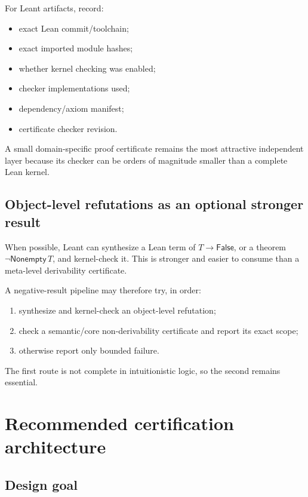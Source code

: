 \documentclass[11pt,letterpaper,openany]{report}
\theoremstyle{definition}
\theoremstyle{remark}
\begin{document}
For Leant artifacts, record:

\begin{itemize}
\item exact Lean commit/toolchain;
\item exact imported module hashes;
\item whether kernel checking was enabled;
\item checker implementations used;
\item dependency/axiom manifest;
\item certificate checker revision.
\end{itemize}

A small domain-specific proof certificate remains the most attractive independent layer because its checker can be orders of magnitude smaller than a complete Lean kernel.

\section{Object-level refutations as an optional stronger result}

When possible, Leant can synthesize a Lean term of \(T\to\mathsf{False}\), or a theorem \(\neg\mathsf{Nonempty}\,T\), and kernel-check it. This is stronger and easier to consume than a meta-level derivability certificate.

A negative-result pipeline may therefore try, in order:

\begin{enumerate}
\item synthesize and kernel-check an object-level refutation;
\item check a semantic/core non-derivability certificate and report its exact scope;
\item otherwise report only bounded failure.
\end{enumerate}

The first route is not complete in intuitionistic logic, so the second remains essential.

\chapter{Recommended certification architecture}
\label{ch:architecture}

\section{Design goal}
\end{document}
